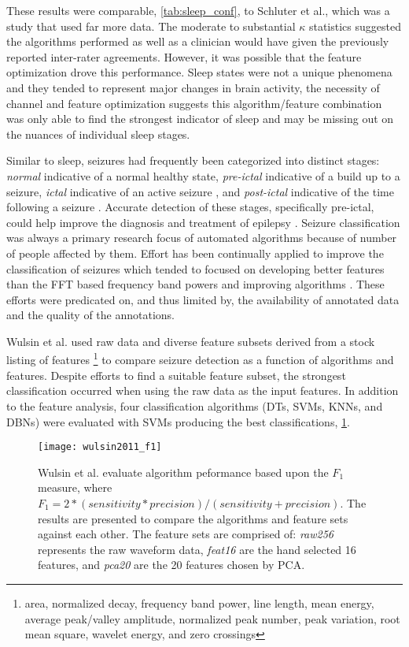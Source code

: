 These results were comparable, \cref{tab:sleep_conf}, to Schluter et al., which was a study that used far more data. The moderate to substantial $\kappa$ statistics suggested the algorithms performed as well as a clinician would have given the previously reported inter-rater agreements. However, it was possible that the feature optimization drove this performance. Sleep states were not a unique phenomena and they tended to represent major changes in brain activity, the necessity of channel and feature optimization suggests this algorithm/feature combination was only able to find the strongest indicator of sleep and may be missing out on the nuances of individual sleep stages.

Similar to sleep, seizures had frequently been categorized into distinct stages: \emph{normal} indicative of a normal healthy state, \emph{pre-ictal} indicative of a build up to a seizure, \emph{ictal} indicative of an active seizure \cite{Acharya2012}, and \emph{post-ictal} indicative of the time following a seizure \cite{Chu2017}. Accurate detection of these stages, specifically pre-ictal, could help improve the diagnosis and treatment of epilepsy \cite{Ramgopal2014}. Seizure classification was always a primary research focus of automated algorithms because of number of people affected by them\cite{Ramgopal2014}. Effort has been continually applied to improve the classification of seizures which tended to focused on developing better features than the \ac{FFT} based frequency band powers \cite{Wulsin2011,Bajaj2012,Chu2017} and improving algorithms \cite{Acharya2012,Ghosh-Dastidar2007,Subasi2005}. These efforts were predicated on, and thus limited by, the availability of annotated data and the quality of the annotations.

Wulsin et al.\cite{Wulsin2011} used raw data and diverse feature subsets derived from a stock listing of features \footnote{area, normalized decay, frequency band power, line length, mean energy, average peak/valley amplitude, normalized peak number, peak variation, root mean square, wavelet energy, and zero crossings} to compare seizure detection as a function of algorithms and features. Despite efforts to find a suitable feature subset, the strongest classification occurred when using the raw data as the input features. In addition to the feature analysis, four classification algorithms (\acp{DT}, \acp{SVM}, \acp{KNN}, and \acp{DBN}) were evaluated with \acp{SVM} producing the best classifications, \cref{fig:wulsin2011_f1}.

\begin{figure}[ht]
\centering
\texttt{[image: wulsin2011\_f1]}
\caption[F1 Performance of Four Supervised Algorithms]{Wulsin et al. evaluate algorithm peformance based upon the $F_{1}$ measure, where $F_{1}=2*(sensitivity*precision)/(sensitivity+precision)$. The results are presented to compare the algorithms and feature sets against each other. The feature sets are comprised of: \textit{raw256} represents the raw waveform data, \textit{feat16} are the hand selected 16 features, and \textit{pca20} are the 20 features chosen by \ac{PCA}. }
\label{fig:wulsin2011_f1}
\end{figure}

